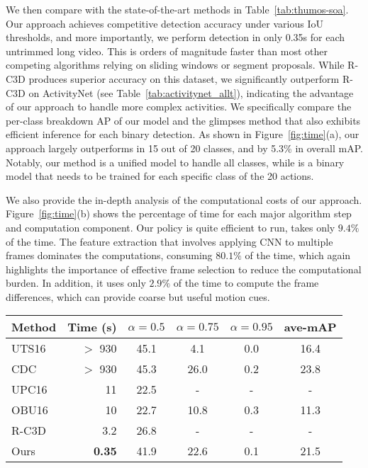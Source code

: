 \documentclass{bmvc2k}
\begin{document}
We then compare with the state-of-the-art methods in Table~\ref{tab:thumos-soa}. Our approach achieves competitive detection accuracy under various IoU thresholds, and more importantly, we perform detection in only 0.35s for each untrimmed long video. This is orders of magnitude faster than most other competing algorithms relying on sliding windows or segment proposals. While R-C3D produces superior accuracy on this dataset, we significantly outperform R-C3D on ActivityNet (see Table~\ref{tab:activitynet_allt}), indicating the advantage of our approach to handle more complex activities. We specifically compare the per-class breakdown AP of our model and the glimpses method \cite{yeung2015end} that also exhibits efficient inference for each binary detection. As shown in Figure~\ref{fig:time}(a), our approach largely outperforms \cite{yeung2015end} in 15 out of 20 classes, and by 5.3\% in overall mAP. Notably, our method is a unified model to handle all classes, while \cite{yeung2015end} is a binary model that needs to be trained for each specific class of the 20 actions. %

We also provide the in-depth analysis of the computational costs of our approach. Figure~\ref{fig:time}(b) shows the percentage of time for each major algorithm step and computation component. Our policy is quite efficient to run, takes only $9.4\%$ of the time. The feature extraction that involves applying CNN to multiple frames dominates the computations, consuming $80.1\%$ of the time, which again highlights the importance of effective frame selection to reduce the computational burden. In addition, it uses only $2.9\%$ of the time to compute the frame differences, which can provide coarse but useful motion cues. 

\begin{table*}[t]
	\small
	\centering
	\begin{tabular}{lrcccc}
		\toprule
		Method & Time (s) & $\alpha = 0.5$ & $\alpha = 0.75$ & $\alpha = 0.95$ & ave-mAP \\
		\midrule
		UTS16 \cite{uts}& $>$ 930 & 45.1 & 4.1 & 0.0 & 16.4\\
        CDC \cite{DBLP:journals/corr/ShouCZMC17} & $>$ 930 & 45.3 & 26.0 & 0.2 & 23.8 \\
        UPC16 \cite{upc} & 11 & 22.5 & - & - & - \\
        OBU16 \cite{singh2016untrimmed}& 10 & 22.7 & 10.8 & 0.3 & 11.3 \\
        R-C3D \cite{r-c3d} & 3.2 & 26.8 & - & - & - \\
		\midrule
        Ours & \textbf{0.35} & 41.9 & 22.6 & 0.1 & 21.5 \\
		\bottomrule
	\end{tabular}
	\vspace{10pt}
	\caption{Comparison of our approach and the state-of-the-art methods in the approximate computation time (s) to process each video and the detection accuracy (mAP) over different IoU thresholds on ActivityNet.}
	\label{tab:activitynet_allt}
\end{table*}  
\end{document}

